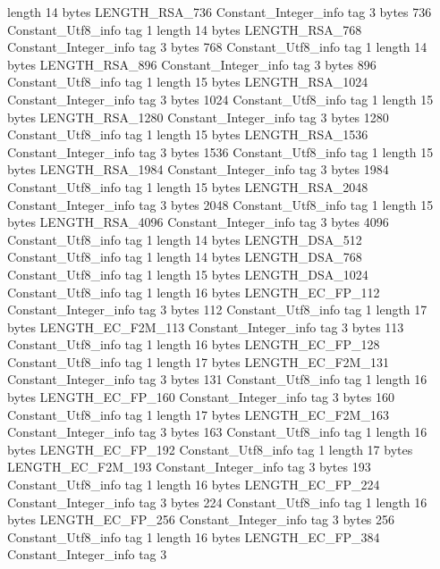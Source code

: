 {{{			length	14
			bytes	LENGTH_RSA_736
		}
		Constant_Integer_info {
			tag	3
			bytes	736
		}
		Constant_Utf8_info {
			tag	1
			length	14
			bytes	LENGTH_RSA_768
		}
		Constant_Integer_info {
			tag	3
			bytes	768
		}
		Constant_Utf8_info {
			tag	1
			length	14
			bytes	LENGTH_RSA_896
		}
		Constant_Integer_info {
			tag	3
			bytes	896
		}
		Constant_Utf8_info {
			tag	1
			length	15
			bytes	LENGTH_RSA_1024
		}
		Constant_Integer_info {
			tag	3
			bytes	1024
		}
		Constant_Utf8_info {
			tag	1
			length	15
			bytes	LENGTH_RSA_1280
		}
		Constant_Integer_info {
			tag	3
			bytes	1280
		}
		Constant_Utf8_info {
			tag	1
			length	15
			bytes	LENGTH_RSA_1536
		}
		Constant_Integer_info {
			tag	3
			bytes	1536
		}
		Constant_Utf8_info {
			tag	1
			length	15
			bytes	LENGTH_RSA_1984
		}
		Constant_Integer_info {
			tag	3
			bytes	1984
		}
		Constant_Utf8_info {
			tag	1
			length	15
			bytes	LENGTH_RSA_2048
		}
		Constant_Integer_info {
			tag	3
			bytes	2048
		}
		Constant_Utf8_info {
			tag	1
			length	15
			bytes	LENGTH_RSA_4096
		}
		Constant_Integer_info {
			tag	3
			bytes	4096
		}
		Constant_Utf8_info {
			tag	1
			length	14
			bytes	LENGTH_DSA_512
		}
		Constant_Utf8_info {
			tag	1
			length	14
			bytes	LENGTH_DSA_768
		}
		Constant_Utf8_info {
			tag	1
			length	15
			bytes	LENGTH_DSA_1024
		}
		Constant_Utf8_info {
			tag	1
			length	16
			bytes	LENGTH_EC_FP_112
		}
		Constant_Integer_info {
			tag	3
			bytes	112
		}
		Constant_Utf8_info {
			tag	1
			length	17
			bytes	LENGTH_EC_F2M_113
		}
		Constant_Integer_info {
			tag	3
			bytes	113
		}
		Constant_Utf8_info {
			tag	1
			length	16
			bytes	LENGTH_EC_FP_128
		}
		Constant_Utf8_info {
			tag	1
			length	17
			bytes	LENGTH_EC_F2M_131
		}
		Constant_Integer_info {
			tag	3
			bytes	131
		}
		Constant_Utf8_info {
			tag	1
			length	16
			bytes	LENGTH_EC_FP_160
		}
		Constant_Integer_info {
			tag	3
			bytes	160
		}
		Constant_Utf8_info {
			tag	1
			length	17
			bytes	LENGTH_EC_F2M_163
		}
		Constant_Integer_info {
			tag	3
			bytes	163
		}
		Constant_Utf8_info {
			tag	1
			length	16
			bytes	LENGTH_EC_FP_192
		}
		Constant_Utf8_info {
			tag	1
			length	17
			bytes	LENGTH_EC_F2M_193
		}
		Constant_Integer_info {
			tag	3
			bytes	193
		}
		Constant_Utf8_info {
			tag	1
			length	16
			bytes	LENGTH_EC_FP_224
		}
		Constant_Integer_info {
			tag	3
			bytes	224
		}
		Constant_Utf8_info {
			tag	1
			length	16
			bytes	LENGTH_EC_FP_256
		}
		Constant_Integer_info {
			tag	3
			bytes	256
		}
		Constant_Utf8_info {
			tag	1
			length	16
			bytes	LENGTH_EC_FP_384
		}
		Constant_Integer_info {
			tag	3
}}}
